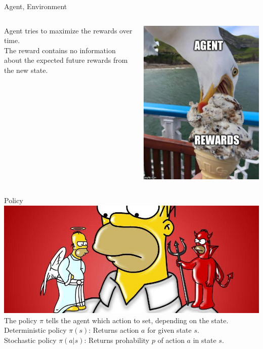 \documentclass{beamer}
\begin{document}

\begin{frame}{Agent, Environment}
	\begin{columns}
			Agent tries to maximize the rewards over time. \\[\baselineskip]
			The reward contains no information about the expected future rewards from the new state. 
		
			\includegraphics[width=0.8\linewidth]{Images/seagul.jpg}
	\end{columns}	
\end{frame}


\begin{frame}{Policy}
	\includegraphics[width=0.9\linewidth]{Images/homer-devil.jpg} \\
	The policy $\pi$ tells the agent which action to set, depending on the state.  \\
	Deterministic policy $\pi(s)$: Returns action $a$ for given state $s$. \\
	Stochastic policy $\pi(a|s)$: Returns prohability $p$ of action $a$ in state $s$.
\end{frame}
\end{document}
